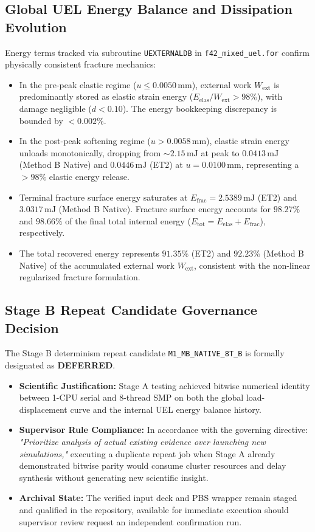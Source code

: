 \subsection{Global UEL Energy Balance and Dissipation Evolution}
\label{subsec:gate6b_energy_balance}

Energy terms tracked via subroutine \texttt{UEXTERNALDB} in \texttt{f42\_mixed\_uel.for} confirm physically consistent fracture mechanics:
\begin{itemize}
  \item In the pre-peak elastic regime ($u \le 0.0050\,\mathrm{mm}$), external work $W_{\mathrm{ext}}$ is predominantly stored as elastic strain energy ($E_{\mathrm{elas}} / W_{\mathrm{ext}} > 98\%$), with damage negligible ($d < 0.10$). The energy bookkeeping discrepancy is bounded by $< 0.002\%$.
  \item In the post-peak softening regime ($u > 0.0058\,\mathrm{mm}$), elastic strain energy unloads monotonically, dropping from $\sim 2.15\,\mathrm{mJ}$ at peak to $0.0413\,\mathrm{mJ}$ (Method B Native) and $0.0446\,\mathrm{mJ}$ (ET2) at $u = 0.0100\,\mathrm{mm}$, representing a $>98\%$ elastic energy release.
  \item Terminal fracture surface energy saturates at $E_{\mathrm{frac}} = 2.5389\,\mathrm{mJ}$ (ET2) and $3.0317\,\mathrm{mJ}$ (Method B Native). Fracture surface energy accounts for $98.27\%$ and $98.66\%$ of the final total internal energy ($E_{\mathrm{tot}} = E_{\mathrm{elas}} + E_{\mathrm{frac}}$), respectively.
  \item The total recovered energy represents $91.35\%$ (ET2) and $92.23\%$ (Method B Native) of the accumulated external work $W_{\mathrm{ext}}$, consistent with the non-linear regularized fracture formulation.
\end{itemize}

\subsection{Stage B Repeat Candidate Governance Decision}
\label{subsec:gate6b_stage_b_governance}

The Stage B determinism repeat candidate \texttt{M1\_MB\_NATIVE\_8T\_B} is formally designated as \textbf{DEFERRED}.
\begin{itemize}
  \item \textbf{Scientific Justification:} Stage A testing achieved bitwise numerical identity between 1-CPU serial and 8-thread SMP on both the global load-displacement curve and the internal UEL energy balance history.
  \item \textbf{Supervisor Rule Compliance:} In accordance with the governing directive: \emph{"Prioritize analysis of actual existing evidence over launching new simulations,"} executing a duplicate repeat job when Stage A already demonstrated bitwise parity would consume cluster resources and delay synthesis without generating new scientific insight.
  \item \textbf{Archival State:} The verified input deck and PBS wrapper remain staged and qualified in the repository, available for immediate execution should supervisor review request an independent confirmation run.
\end{itemize}

